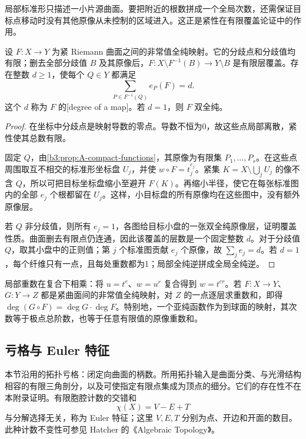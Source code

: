 局部标准形只描述一小片源曲面。要把附近的根数拼成一个全局次数，还需保证目标点移动时没有其他原像从未控制的区域进入。这正是紧性在有限覆盖论证中的作用。

\begin{proposition}[纤维的重数和]\label{b3:prop:A-degree-fibers}
设 \(F:X\rightarrow Y\) 为紧 Riemann 曲面之间的非常值全纯映射。它的分歧点和分歧值均有限；删去全部分歧值 \(B\) 及其原像后，\(F:X\setminus F^{-1}(B)\rightarrow Y\setminus B\) 是有限层覆盖。存在整数 \(d\ge1\)，使每个 \(Q\in Y\) 都满足
\[
 \sum_{P\in F^{-1}(Q)}e_P(F)=d.
\]
这个 \(d\) 称为 \(F\) 的[degree of a map]。若 \(d=1\)，则 \(F\) 双全纯。
\end{proposition}
\begin{proof}
在坐标中分歧点是映射导数的零点。导数不恒为0，故这些点局部离散，紧性使其总数有限。

固定 \(Q\)，由\cref{b3:prop:A-compact-functions}，其原像为有限集 \(P_1,\ldots,P_s\)。在这些点周围取互不相交的标准形坐标盘 \(U_j\)，并使 \(w\circ F=t_j^{e_j}\)。紧集 \(K=X\setminus\bigcup_j U_j\) 的像不含 \(Q\)，所以可把目标坐标盘缩小至避开 \(F(K)\)。再缩小半径，使它在每张标准图内的全部 \(e_j\) 个根都留在 \(U_j\)。这样，小目标盘的所有原像均在这些图中，没有额外原像层。

若 \(Q\) 非分歧值，则所有 \(e_j=1\)，各图给目标小盘的一张双全纯原像层，证明覆盖性质。曲面删去有限点仍连通，因此该覆盖的层数是一个固定整数 \(d\)。对于分歧值 \(Q\)，取其小盘中的正则值；第 \(j\) 个标准图贡献 \(e_j\) 个原像，故 \(\sum_j e_j=d\)。若 \(d=1\)，每个纤维只有一点，且每处重数都为1；局部全纯逆拼成全局全纯逆。
\end{proof}

局部重数在复合下相乘：将 \(u=t^e\)、\(w=u^r\) 复合得到 \(w=t^{er}\)。若 \(F:X\rightarrow Y\)、\(G:Y\rightarrow Z\) 都是紧曲面间的非常值全纯映射，对 \(Z\) 的一点逐层求重数和，即得 \(\deg(G\circ F)=\deg G\cdot\deg F\)。特别地，一个亚纯函数作为到球面的映射，其次数等于极点总阶数，也等于任意有限值的原像重数和。

\subsection{亏格与 Euler 特征}
\label{b3:subsec:A0302}

本节沿用的拓扑亏格：闭定向曲面的柄数。所用拓扑输入是曲面分类、与光滑结构相容的有限三角剖分，以及可使指定有限点集成为顶点的细分。它们的存在性不在本附录证明。有限胞腔计数的交错和
\[
 \chi(X)=V-E+T
\]
与分解选择无关，称为 Euler 特征；这里 \(V,E,T\) 分别为点、开边和开面的数目。此种计数不变性可参见 Hatcher 的《Algebraic Topology》\cite[pp. 146--147, Theorem 2.44]{Hatcher2002Algebraic}。

